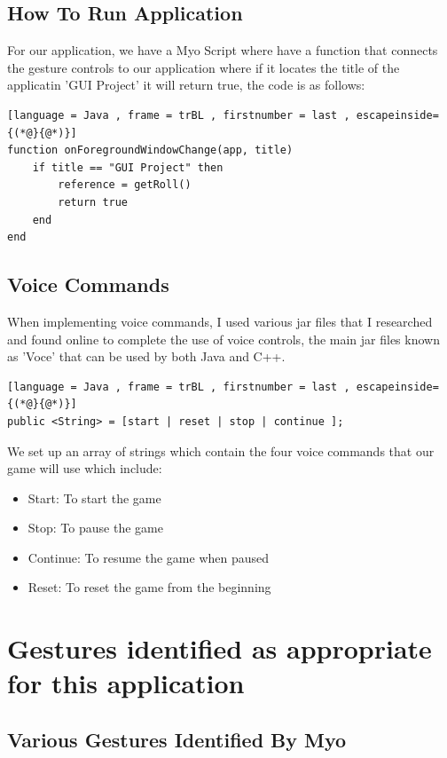 \documentclass{article}
\begin{document}
\subsection{How To Run Application}

For our application, we have a Myo Script where have a function that connects the gesture controls to our application where if it locates the title of the applicatin 'GUI Project' it will return true, the code is as follows:

\begin{lstlisting}[language = Java , frame = trBL , firstnumber = last , escapeinside={(*@}{@*)}]
function onForegroundWindowChange(app, title)
    if title == "GUI Project" then
        reference = getRoll()
        return true
    end 
end
\end{lstlisting}

\subsection{Voice Commands}

When implementing voice commands, I used various jar files that I researched and found online to complete the use of voice controls, the main jar files known as 'Voce' that can be used by both Java and C++.

\begin{lstlisting}[language = Java , frame = trBL , firstnumber = last , escapeinside={(*@}{@*)}]
public <String> = [start | reset | stop | continue ];
\end{lstlisting}
We set up an array of strings which contain the four voice commands that our game will use which include:

\begin{itemize}
    \item Start: To start the game
    \item Stop: To pause the game
    \item Continue: To resume the game when paused
    \item Reset: To reset the game from the beginning
\end{itemize}

\section{Gestures identified as appropriate for this application}

\subsection{Various Gestures Identified By Myo}
\end{document}
